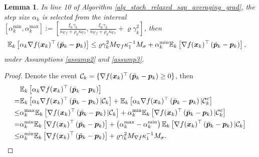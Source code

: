 \documentclass[aos]{imsart}
\numberwithin{equation}{section}
\theoremstyle{plain}
\newtheorem{lemma}{Lemma}
\begin{document}
\begin{appendix}
\begin{lemma}
\label{lemma23}
    In line 10 of Algorithm \ref{alg_stoch_relaxed_sqp_averaging_grad}, the step size $\alpha_k$ is selected from the interval $[\alpha_k^{\text{min}},\alpha_k^{\text{max}}]:=\left[ \frac{ \xi_{k}\gamma_k}{\kappa_{\nabla f} + \rho_k \kappa_{\nabla c}} , \frac{ \xi_{k}\gamma_k}{\kappa_{\nabla f} + \rho_k \kappa_{\nabla c}} + \varrho \gamma_k^2 \right]$, then 
    \begin{equation}
    \begin{split}
        \mathbb{E}_k \left[ \alpha_k \nabla f(\bm{x}_k)^{\top} \left( \Bar{\bm{p}}_k - \bm{p}_k \right) \right] & \leq \varrho \gamma_k^2 M_{\nabla f} \kappa_1^{-1} M_{\sigma}  + \alpha_k^{\text{min}}  \mathbb{E}_k \left[ \nabla f(\bm{x}_k)^{\top} \left( \Bar{\bm{p}}_k - \bm{p}_k \right)\right],
    \end{split}
    \end{equation}
    under Assumptions \ref{assump2} and \ref{assump3}.
\end{lemma}




\begin{proof}
Denote the event $\mathcal{C}_k = \{\nabla f(\bm{x}_k)^{\top} \left( \Bar{\bm{p}}_k - \bm{p}_k \right) \geq 0\}$, then
    \begin{equation*}
        \begin{split}
             & \mathbb{E}_k \left[ \alpha_k \nabla f(\bm{x}_k)^{\top} \left( \Bar{\bm{p}}_k - \bm{p}_k \right) \right] \\
             = & \mathbb{E}_k \left[ \alpha_k \nabla f(\bm{x}_k)^{\top} \left( \Bar{\bm{p}}_k - \bm{p}_k \right) | \mathcal{C}_{k} \right] + \mathbb{E}_k \left[ \alpha_k \nabla f(\bm{x}_k)^{\top} \left( \Bar{\bm{p}}_k - \bm{p}_k \right) | \mathcal{C}_{k}^{c} \right] \\
             \leq & \alpha_k^{\text{max}}  \mathbb{E}_k \left[  \nabla f(\bm{x}_k)^{\top} \left( \Bar{\bm{p}}_k - \bm{p}_k \right) | \mathcal{C}_{k} \right] +  \alpha_k^{\text{min}}  \mathbb{E}_k \left[  \nabla f(\bm{x}_k)^{\top} \left( \Bar{\bm{p}}_k - \bm{p}_k \right) | \mathcal{C}_{k}^{c} \right] \\
             = & \alpha_k^{\text{min}}  \mathbb{E}_k \left[  \nabla f(\bm{x}_k)^{\top} \left( \Bar{\bm{p}}_k - \bm{p}_k \right)\right] + \left( \alpha_k^{\text{max}}  - \alpha_k^{\text{min}}  \right) \mathbb{E}_k \left[  \nabla f(\bm{x}_k)^{\top} \left( \Bar{\bm{p}}_k - \bm{p}_k \right) | \mathcal{C}_{k} \right] \\
             \leq & \alpha_k^{\text{min}}  \mathbb{E}_k \left[  \nabla f(\bm{x}_k)^{\top} \left( \Bar{\bm{p}}_k - \bm{p}_k \right)\right] + \varrho \gamma_k^2 M_{\nabla f} \kappa_1^{-1} M_{\sigma}.
        \end{split}
    \end{equation*}
\end{proof}




\end{appendix}
\end{document}
